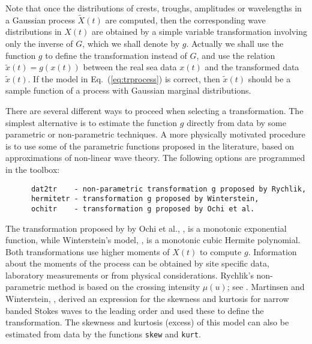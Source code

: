 Note that once the distributions of crests, troughs, amplitudes or
wavelengths in a Gaussian process $\widetilde X (t)$ are computed, then
the corresponding wave distributions in $X(t)$ are obtained by a simple
variable transformation involving only the inverse of $G$, which we
shall denote by $g$. Actually we shall use the function $g$ to define
the transformation instead of $G$, and use the relation $\widetilde x
(t) = g(x(t))$ between the real sea data $x(t)$ and the transformed
data $\widetilde x (t)$.
If the model in Eq.~(\ref{eq:trprocess}) is correct, then
$\widetilde x(t)$ should be a sample function of a process with
Gaussian marginal distributions.

There are several different ways to proceed when selecting a transformation.
The simplest alternative is to estimate the function
$g$ directly from data by some parametric or non-parametric techniques. A more
physically motivated procedure is to use some of the parametric functions
proposed in the literature, based on approximations of non-linear wave
theory.  The following options are programmed in the
toolbox:
{\small\begin{verbatim}
      dat2tr    - non-parametric transformation g proposed by Rychlik,
      hermitetr - transformation g proposed by Winterstein,
      ochitr    - transformation g proposed by Ochi et al.
\end{verbatim}}

The transformation proposed by by Ochi et al.,
\cite{OchiAndAhn1994Probability},
is a monotonic exponential function, while Winterstein's model,
\cite{Winterstein1988Nonlinear}, is a
monotonic cubic Hermite polynomial. Both transformations use higher moments
of $X(t)$ to compute $g$. Information about the moments of the process
can be obtained by site specific data, laboratory measurements or from
physical considerations. Rychlik's non-parametric method is based on
the crossing intensity $\mu(u)$; see \cite{RychlikEtal1997Modelling}.
Martinsen and Winterstein, \cite{MarthinsenAndWinterstein1992Skewness},
derived an expression for the
skewness and kurtosis for narrow banded Stokes waves to the leading order
and used these to define the transformation.
The skewness and kurtosis (excess) of this model can also be estimated from
data by the \progname{} functions {\tt skew}
and {\tt kurt}.

